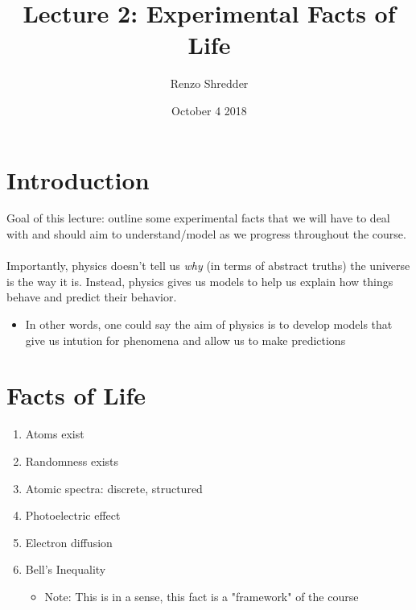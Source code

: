 \documentclass[a4paper]{article}
\title{Lecture 2: Experimental Facts of Life}
\author{Renzo Shredder}
\date{October 4 2018}
\begin{document}
\maketitle
\section*{Introduction}
Goal of this lecture: outline some experimental facts that we will have to deal with and should aim to understand/model as we progress throughout the course.
\\
\\
Importantly, physics doesn't tell us \textit{why} (in terms of abstract truths) the universe is the way it is. Instead, physics gives us models to help us explain how things behave and predict their behavior.
\begin{itemize}
    \item In other words, one could say the aim of physics is to develop models that give us intution for phenomena and allow us to make predictions
\end{itemize}

\section*{Facts of Life}
\begin{enumerate}
    \item Atoms exist
    \item Randomness exists 
    \item Atomic spectra: discrete, structured 
    \item Photoelectric effect 
    \item Electron diffusion
    \item Bell's Inequality 
        \begin{itemize}
            \item Note: This is in a sense, this fact is a "framework" of the course
        \end{itemize}  
\end{enumerate}
\end{document}
